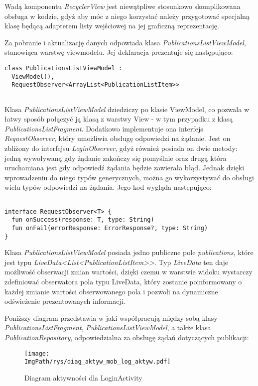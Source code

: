 \documentclass[a4paper,12pt,twoside,openany]{report}
\newcommand{\ImgPath}{.}
\begin{document}
Wadą komponentu \textit{RecyclerView} jest niewątpliwe stosunkowo skomplikowana obsługa w kodzie, gdyż aby móc z niego korzystać należy przygotować specjalną klasę będącą adapterem listy wejściowej na jej graficzną reprezentację.

Za pobranie i aktualizację danych odpowiada klasa  \textit{PublicationsListViewModel}, stanowiąca warstwę viewmodelu.
Jej deklaracja prezentuje się następująco:
\begin{verbatim}
class PublicationsListViewModel : 
  ViewModel(),
  RequestObserver<ArrayList<PublicationListItem>> 
  
\end{verbatim}
Klasa \textit{PublicationsListViewModel} dziedziczy po klasie ViewModel, co pozwala w łatwy sposób połączyć ją klasą z warstwy View - w tym przypadku z klasą \textit{PublicationsListFragment}. Dodatkowo implementuje ona interfejs \textit{RequestObserver}, który umożliwia obsługę odpowiedzi na żądanie. Jest on zbliżony do interfejsu \textit{LoginObserver}, gdyż również posiada on dwie metody: jedną wywoływaną gdy żądanie zakończy się pomyślnie oraz drugą która uruchamiana jest gdy odpowiedź żądania będzie zawierała błąd. Jednak dzięki wprowadzeniu do niego typów generycznych, można go wykorzystywać do obsługi wielu typów odpowiedzi na żądania. Jego kod wygląda następująco:
\begin{verbatim}

interface RequestObserver<T> {
  fun onSuccess(response: T, type: String)
  fun onFail(errorResponse: ErrorResponse?, type: String)
}

\end{verbatim}
 Klasa \textit{PublicationsListViewModel} posiada jedno publiczne pole \textit{publications}, które jest typu \textit{LiveData<List<PublicationListItem>>}. Typ \textit{LiveData} ten daje możliwość obserwacji zmian wartości, dzięki czemu w warstwie widoku wystarczy zdefiniować obserwatora pola typu LiveData, który zostanie poinformowany o każdej zmianie wartości obserwowanego pola i pozwoli na dynamiczne odświeżenie prezentowanych informacji.
 
Poniższy diagram przedstawia w jaki współpracują między sobą klasy \textit{PublicationsListFragment}, \textit{PublicationsListViewModel}, a także klasa \textit{PublicationRepository}, odpowiedzialna za obsługę żądań dotyczących publikacji:
\begin{figure}[!htbp]
	\begin{center}
		\centering
		\texttt{[image: \\ImgPath/rys/diag\_aktyw\_mob\_log\_aktyw.pdf]}
	\end{center}
	\caption{Diagram aktywności dla LoginActivity}
	\label{diagramAktywnosciLoginActivity}
\end{figure}
\end{document}
